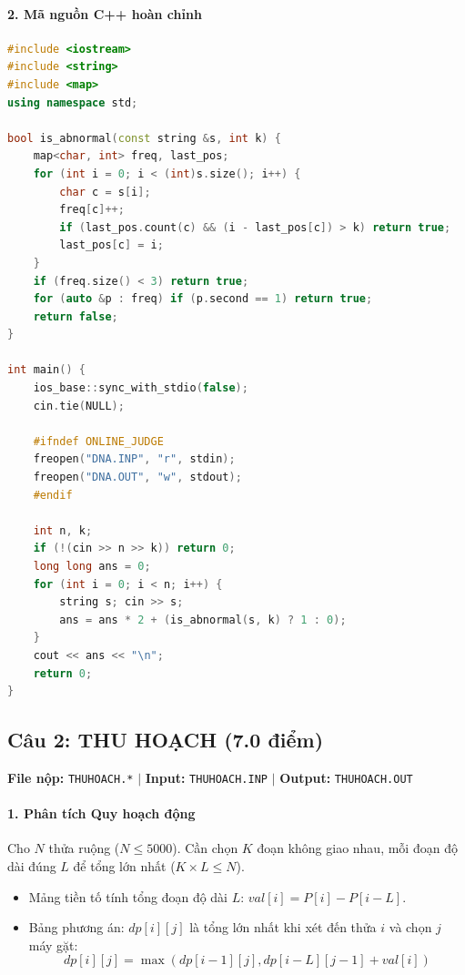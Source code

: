 \documentclass[11pt,a4paper]{article}
\begin{document}
\paragraph{2. Mã nguồn C++ hoàn chỉnh}
\begin{lstlisting}[language=C++]
#include <iostream>
#include <string>
#include <map>
using namespace std;

bool is_abnormal(const string &s, int k) {
    map<char, int> freq, last_pos;
    for (int i = 0; i < (int)s.size(); i++) {
        char c = s[i];
        freq[c]++;
        if (last_pos.count(c) && (i - last_pos[c]) > k) return true;
        last_pos[c] = i;
    }
    if (freq.size() < 3) return true;
    for (auto &p : freq) if (p.second == 1) return true;
    return false;
}

int main() {
    ios_base::sync_with_stdio(false);
    cin.tie(NULL);

    #ifndef ONLINE_JUDGE
    freopen("DNA.INP", "r", stdin);
    freopen("DNA.OUT", "w", stdout);
    #endif

    int n, k;
    if (!(cin >> n >> k)) return 0;
    long long ans = 0;
    for (int i = 0; i < n; i++) {
        string s; cin >> s;
        ans = ans * 2 + (is_abnormal(s, k) ? 1 : 0);
    }
    cout << ans << "\n";
    return 0;
}
\end{lstlisting}

\newpage

\subsection{Câu 2: THU HOẠCH (7.0 điểm)}
\textbf{File nộp:} \texttt{THUHOACH.*} $\vert$ \textbf{Input:} \texttt{THUHOACH.INP} $\vert$ \textbf{Output:} \texttt{THUHOACH.OUT}

\paragraph{1. Phân tích Quy hoạch động}
Cho $N$ thửa ruộng ($N \le 5000$). Cần chọn $K$ đoạn không giao nhau, mỗi đoạn độ dài đúng $L$ để tổng lớn nhất ($K \times L \le N$).
\begin{itemize}
    \item Mảng tiền tố tính tổng đoạn độ dài $L$: $val[i] = P[i] - P[i - L]$.
    \item Bảng phương án: $dp[i][j]$ là tổng lớn nhất khi xét đến thửa $i$ và chọn $j$ máy gặt:
    \[
    dp[i][j] = \max(dp[i - 1][j], dp[i - L][j - 1] + val[i])
    \]
\end{itemize}
\end{document}
